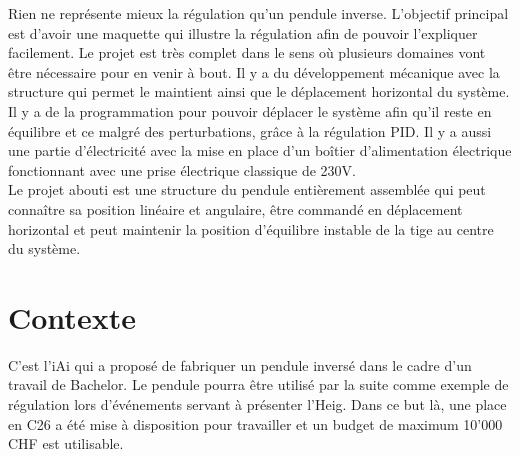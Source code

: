 Rien ne représente mieux la régulation qu'un pendule inverse. L'objectif principal est d'avoir une maquette qui illustre la régulation
afin de pouvoir l'expliquer facilement. Le projet est très complet dans le sens où plusieurs domaines vont être nécessaire pour en venir
à bout. Il y a du développement mécanique avec la structure qui permet le maintient ainsi que le déplacement horizontal du système.
Il y a de la programmation pour pouvoir déplacer le système afin qu'il reste en équilibre et ce malgré des perturbations, grâce à la
régulation PID. Il y a aussi une partie d'électricité avec la mise en place d'un boîtier d'alimentation électrique fonctionnant avec une
prise électrique classique de 230V.\\

Le projet abouti est une structure du pendule entièrement assemblée qui peut connaître sa position linéaire et angulaire, être commandé
en déplacement horizontal et peut maintenir la position d'équilibre instable de la tige au centre du système.

\section{Contexte}
C'est l'\acrlong{iAi} qui a proposé de fabriquer un pendule inversé dans le cadre d'un travail
de Bachelor. Le pendule pourra être utilisé par la suite comme exemple de régulation lors d'événements servant à présenter l'\acrshort{Heig}.
Dans ce but là, une place en C26 a été mise à disposition pour travailler et un budget de maximum 10'000 CHF est utilisable.